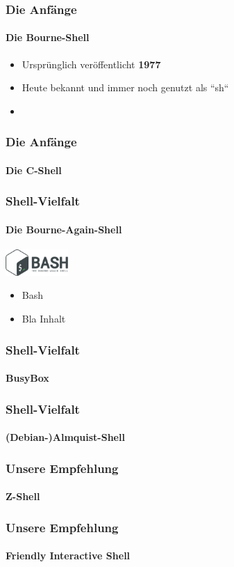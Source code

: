 \documentclass[12pt,utf8]{beamer}
\begin{document}
	\begin{frame}
	\frametitle{Die Anfänge}
	\framesubtitle{Die Bourne-Shell}
	\begin{itemize}
		\item Ursprünglich veröffentlicht \textbf{1977}
		\item Heute bekannt und immer noch genutzt als ``sh``
		\item 
	\end{itemize}
	\end{frame}

	\begin{frame}
	\frametitle{Die Anfänge}
	\framesubtitle{Die C-Shell}
	\end{frame}

	\begin{frame}
	\frametitle{Shell-Vielfalt}
	\framesubtitle{Die Bourne-Again-Shell}
	\includegraphics[height=1cm]{res/bash.png}
	\begin{itemize}
		\item Bash
		\item \begin{alertblock}{Bla}
			Inhalt
		\end{alertblock}
	\end{itemize}
	\end{frame}
	
	\begin{frame}
	\frametitle{Shell-Vielfalt}
	\framesubtitle{BusyBox}
	\end{frame}

	\begin{frame}
	\frametitle{Shell-Vielfalt}
	\framesubtitle{(Debian-)Almquist-Shell}
	\end{frame}

	\begin{frame}
	\frametitle{Unsere Empfehlung}
	\framesubtitle{Z-Shell}
	\end{frame}

	\begin{frame}
	\frametitle{Unsere Empfehlung}
	\framesubtitle{Friendly Interactive Shell}
	\end{frame}
\end{document}
